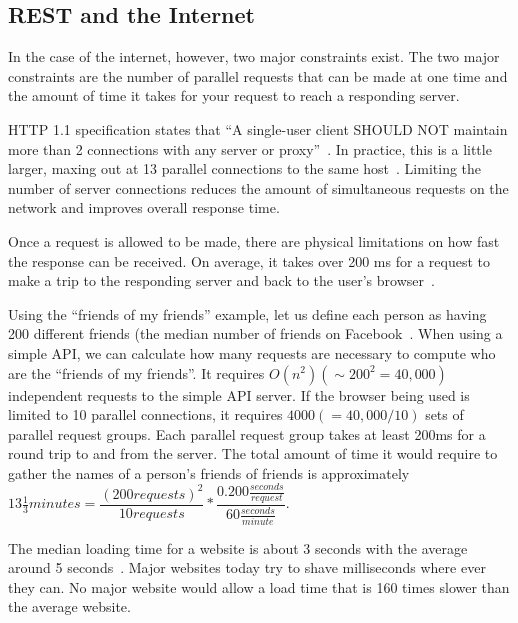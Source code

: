 \documentclass[stat,dissertation]{puthesis}\usepackage[]{graphicx}\usepackage{xcolor}
\begin{document}
\subsection{REST and the Internet}

In the case of the internet, however, two major constraints exist.  The two major constraints are the number of parallel requests that can be made at one time and the amount of time it takes for your request to reach a responding server.

HTTP 1.1 specification states that ``A single-user client SHOULD NOT maintain more than 2 connections with any server or proxy''~\cite{http_connections}.  In practice, this is a little larger, maxing out at 13 parallel connections to the same host~\cite{browserscope}.  Limiting the number of server connections reduces the amount of simultaneous requests on the network and improves overall response time.

Once a request is allowed to be made, there are physical limitations on how fast the response can be received.  On average, it takes over 200 ms for a request to make a trip to the responding server and back to the user's browser~\cite{internetweathermap}.

Using the ``friends of my friends'' example, let us define each person as having 200 different friends (the median number of friends on Facebook~\cite{facebook_friends}.  When using a simple API, we can calculate how many requests are necessary to compute who are the ``friends of my friends''. It requires $O(n^2) (\sim 200^2 = 40,000)$ independent requests to the simple API server.  If the browser being used is limited to 10 parallel connections, it requires $4000 (= 40,000 / 10)$ sets of parallel request groups.  Each parallel request group takes at least 200ms for a round trip to and from the server.  The total amount of time it would require to gather the names of a person's friends of friends is approximately $13 \frac{1}{3} minutes = \dfrac{(200 requests)^2}{10 requests} * \dfrac{0.200 \frac{seconds}{request}}{60 \frac{seconds}{minute}}$.

The median loading time for a website is about 3 seconds with the average around 5 seconds~\cite{website_speed}.  Major websites today try to shave milliseconds where ever they can.  No major website would allow a load time that is 160 times slower than the average website.

\end{document}
